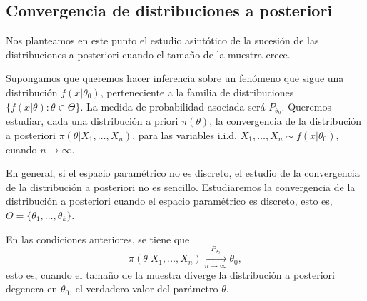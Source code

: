 \subsection{Convergencia de distribuciones a posteriori} \label{sec:bayes:convergencia}

Nos planteamos en este punto el estudio asintótico de la sucesión de las distribuciones a posteriori cuando el tamaño de la muestra crece.

Supongamos que queremos hacer inferencia sobre un fenómeno que sigue una distribución $f(x|\theta_0)$, perteneciente a la familia de distribuciones $\{f(x|\theta) : \theta\in\Theta\}$. La medida de probabilidad asociada será $P_{\theta_0}$. Queremos estudiar, dada una distribución a priori $\pi(\theta)$, la convergencia de la distribución a posteriori $\pi(\theta|X_1,\ldots,X_n)$, para las variables i.i.d. $X_1,\ldots,X_n \sim f(x|\theta_0)$,  cuando $n \to \infty$.

En general, si el espacio paramétrico no es discreto, el estudio de la convergencia de la distribución a posteriori no es sencillo. Estudiaremos la convergencia de la distribución a posteriori cuando el espacio paramétrico es discreto, esto es, $\Theta = \{\theta_1,\ldots,\theta_k\}$.

\begin{thm}
	En las condiciones anteriores, se tiene que
	\[\pi(\theta|X_1,\ldots,X_n) \xrightarrow[n\to\infty]{P_{\theta_0}} \theta_0,\]
    esto es, cuando el tamaño de la muestra diverge la distribución a posteriori degenera en $\theta_0$, el verdadero valor del parámetro $\theta$.
\end{thm}

